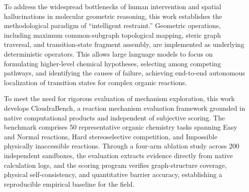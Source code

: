 To address the widespread bottlenecks of human intervention and spatial hallucinations in molecular geometric reasoning, this work establishes the methodological paradigm of “intelligent restraint.” Geometric operations, including maximum common-subgraph topological mapping, steric graph traversal, and transition-state fragment assembly, are implemented as underlying deterministic operators. This allows large language models to focus on formulating higher-level chemical hypotheses, selecting among competing pathways, and identifying the causes of failure, achieving end-to-end autonomous localization of transition states for complex organic reactions.

To meet the need for rigorous evaluation of mechanism exploration, this work develops CloudraBench, a reaction mechanism evaluation framework grounded in native computational products and independent of subjective scoring. The benchmark comprises 50 representative organic chemistry tasks spanning Easy and Normal reactions, Hard stereoselective competition, and Impossible physically inaccessible reactions. Through a four-arm ablation study across 200 independent sandboxes, the evaluation extracts evidence directly from native calculation logs, and the scoring program verifies graph-structure coverage, physical self-consistency, and quantitative barrier accuracy, establishing a reproducible empirical baseline for the field.
